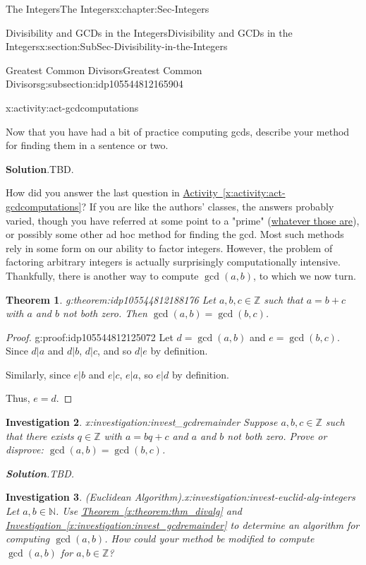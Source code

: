 \documentclass[oneside,10pt,]{book}
\newcommand{\blocktitlefont}{\relax}
\newcommand{\xreffont}{\relax}
\numberwithin{equation}{section}
\def\Z{{\mathbb Z}}
\def\N{{\mathbb N}}
\newtheorem{theorem}{Theorem}[section]
\newtheorem{investigation}[theorem]{Investigation}
\begin{document}
\begin{chapterptx}{The Integers}{}{The Integers}{}{}{x:chapter:Sec-Integers}
\begin{sectionptx}{Divisibility and GCDs in the Integers}{}{Divisibility and GCDs in the Integers}{}{}{x:section:SubSec-Divisibility-in-the-Integers}
\begin{subsectionptx}{Greatest Common Divisors}{}{Greatest Common Divisors}{}{}{g:subsection:idp105544812165904}
\begin{activity}{}{x:activity:act-gcdcomputations}
\begin{enumerate}
\end{enumerate}
Now that you have had a bit of practice computing gcds, describe your method for finding them in a sentence or two.%
\par\smallskip%
\noindent\textbf{\blocktitlefont Solution}.\hypertarget{g:solution:idp105544812186000}{}\quad{}TBD.%
\end{activity}%
How did you answer the last question in \hyperref[x:activity:act-gcdcomputations]{Activity~{\xreffont\ref{x:activity:act-gcdcomputations}}}? If you are like the authors' classes, the answers probably varied, though you have referred at some point to a "prime" (\hyperref[x:definition:def-primeinteger]{whatever those are}), or possibly some other ad hoc method for finding the gcd. Most such methods rely in some form on our ability to factor integers. However, the problem of factoring arbitrary integers is actually surprisingly computationally intensive. Thankfully, there is another way to compute \(\gcd(a,b)\), to which we now turn.%
\begin{theorem}{}{}{g:theorem:idp105544812188176}%
Let \(a,b,c\in\Z\) such that \(a = b+c\) with \(a\) and \(b\) not both zero. Then \(\gcd(a,b) = \gcd(b,c)\).%
\end{theorem}
\begin{proof}{}{g:proof:idp105544812125072}
Let \(d = \gcd(a,b)\) and \(e = \gcd(b,c)\). Since \(d|a\) and \(d|b\), \(d|c\), and so \(d|e\) by definition.%
\par
Similarly, since \(e|b\) and \(e|c\), \(e|a\), so \(e|d\) by definition.%
\par
Thus, \(e = d\).%
\end{proof}
\begin{investigation}{}{x:investigation:invest_gcdremainder}%
Suppose \(a,b,c\in\Z\) such that there exists \(q\in\Z\) with \(a = bq + c\) and \(a\) and \(b\) not both zero. Prove or disprove: \(\gcd(a,b)=\gcd(b,c)\).%
\par\smallskip%
\noindent\textbf{\blocktitlefont Solution}.\hypertarget{g:solution:idp105544812133392}{}\quad{}TBD.\end{investigation}%
\begin{investigation}{(Euclidean Algorithm).}{x:investigation:invest-euclid-alg-integers}%
%
Let \(a,b\in \N\). Use \hyperref[x:theorem:thm_divalg]{Theorem~{\xreffont\ref{x:theorem:thm_divalg}}} and \hyperref[x:investigation:invest_gcdremainder]{Investigation~{\xreffont\ref{x:investigation:invest_gcdremainder}}} to determine an algorithm for computing \(\gcd(a,b)\). How could your method be modified to compute \(\gcd(a,b)\) for \(a,b\in\Z\)?%

\end{investigation}
\end{subsectionptx}
\end{sectionptx}
\end{chapterptx}
\end{document}
